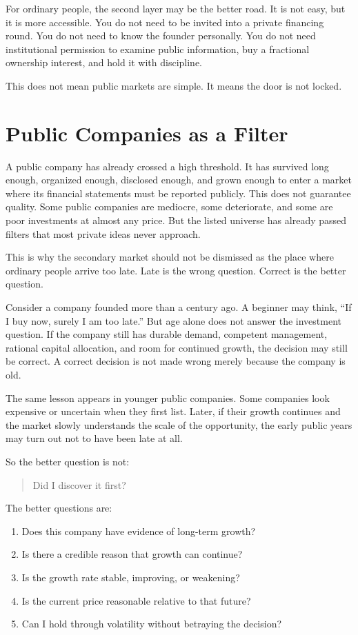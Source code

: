 For ordinary people, the second layer may be the better road. It is not easy, but it is more accessible. You do not need to be invited into a private financing round. You do not need to know the founder personally. You do not need institutional permission to examine public information, buy a fractional ownership interest, and hold it with discipline.

This does not mean public markets are simple. It means the door is not locked.

\section*{Public Companies as a Filter}

A public company has already crossed a high threshold. It has survived long enough, organized enough, disclosed enough, and grown enough to enter a market where its financial statements must be reported publicly. This does not guarantee quality. Some public companies are mediocre, some deteriorate, and some are poor investments at almost any price. But the listed universe has already passed filters that most private ideas never approach.

This is why the secondary market should not be dismissed as the place where ordinary people arrive too late. Late is the wrong question. Correct is the better question.

Consider a company founded more than a century ago. A beginner may think, ``If I buy now, surely I am too late.'' But age alone does not answer the investment question. If the company still has durable demand, competent management, rational capital allocation, and room for continued growth, the decision may still be correct. A correct decision is not made wrong merely because the company is old.

The same lesson appears in younger public companies. Some companies look expensive or uncertain when they first list. Later, if their growth continues and the market slowly understands the scale of the opportunity, the early public years may turn out not to have been late at all.

So the better question is not:

\begin{quote}
Did I discover it first?
\end{quote}

The better questions are:

\begin{enumerate}
\item Does this company have evidence of long-term growth?
\item Is there a credible reason that growth can continue?
\item Is the growth rate stable, improving, or weakening?
\item Is the current price reasonable relative to that future?
\item Can I hold through volatility without betraying the decision?
\end{enumerate}

